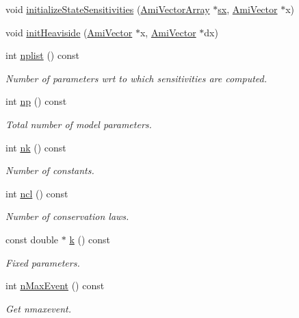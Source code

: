 \begin{DoxyCompactItemize}
\item 
void \mbox{\hyperlink{classamici_1_1_model_a9dd884d676d173f976a8e74ef7717198}{initialize\+State\+Sensitivities}} (\mbox{\hyperlink{classamici_1_1_ami_vector_array}{Ami\+Vector\+Array}} $\ast$\mbox{\hyperlink{classamici_1_1_model_ac3288cc7f649605938f1fd1b459d3d8c}{sx}}, \mbox{\hyperlink{classamici_1_1_ami_vector}{Ami\+Vector}} $\ast$x)
\item 
void \mbox{\hyperlink{classamici_1_1_model_afc1c1ffc33f397ed131f85c8321dd677}{init\+Heaviside}} (\mbox{\hyperlink{classamici_1_1_ami_vector}{Ami\+Vector}} $\ast$x, \mbox{\hyperlink{classamici_1_1_ami_vector}{Ami\+Vector}} $\ast$dx)
\item 
int \mbox{\hyperlink{classamici_1_1_model_a0f8e994055e37954d7746f3c1af27a5c}{nplist}} () const
\begin{DoxyCompactList}\small\item\em Number of parameters wrt to which sensitivities are computed. \end{DoxyCompactList}\item 
int \mbox{\hyperlink{classamici_1_1_model_ae296546c9fd4d7c4ad3b7000aa9e22ef}{np}} () const
\begin{DoxyCompactList}\small\item\em Total number of model parameters. \end{DoxyCompactList}\item 
int \mbox{\hyperlink{classamici_1_1_model_a3d4130da64883565a06a86e7d6029da1}{nk}} () const
\begin{DoxyCompactList}\small\item\em Number of constants. \end{DoxyCompactList}\item 
int \mbox{\hyperlink{classamici_1_1_model_a158b8a049de50ecddfe5cd120ff549ac}{ncl}} () const
\begin{DoxyCompactList}\small\item\em Number of conservation laws. \end{DoxyCompactList}\item 
const double $\ast$ \mbox{\hyperlink{classamici_1_1_model_adde50e0d8a99d20354c8403bf93fab6f}{k}} () const
\begin{DoxyCompactList}\small\item\em Fixed parameters. \end{DoxyCompactList}\item 
int \mbox{\hyperlink{classamici_1_1_model_ac6ea00eafac9ec7be198bca04b19f4c3}{n\+Max\+Event}} () const
\begin{DoxyCompactList}\small\item\em Get nmaxevent. \end{DoxyCompactList}\item 

\end{DoxyCompactItemize}

